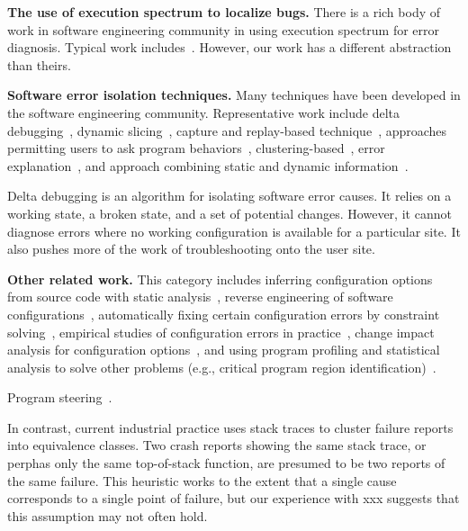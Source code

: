 \textbf{The use of execution spectrum to localize bugs.} There is a rich body of
work in software engineering community in using execution spectrum for error diagnosis.
Typical work includes~\cite{Liblit:2005:SSBI, Santelices:2009:LFU, Reps:1997:UPP,
Yilmaz:2008:TTF}. However, our work has a different abstraction than theirs.

\textbf{Software error isolation techniques.} Many techniques have been developed
in the software engineering community. Representative work include delta debugging~\cite{Zeller:2002:ICC},
dynamic slicing~\cite{Zhang:2006:LFT},
capture and replay-based technique~\cite{Qi:2011:LFE}, approaches permitting
users to ask program behaviors~\cite{Ko:2008:DRA},
clustering-based~\cite{Dickinson:2001:FFC},
error explanation~\cite{Groce:2006:EED},
and approach combining static and dynamic information~\cite{Holmes:2011:IPT, Zhang:2008:EIF}.

Delta debugging is an algorithm for isolating software error causes. It relies on
a working state, a broken state, and a set of potential changes. However, it
cannot diagnose errors where no working configuration is available for
a particular site. It also pushes more of the work of troubleshooting
onto the user site.


\textbf{Other related work.} This category includes inferring configuration options
from source code with static analysis~\cite{Rabkin:2011:SEP}, 
reverse engineering of software configurations~\cite{Wang:2008:TAR}, automatically
fixing certain configuration errors by constraint solving~\cite{rangefix},
empirical studies of configuration errors in practice~\cite{Yin:2011:ESC, Hubaux:2012},
change impact analysis for configuration options~\cite{configimpact},
and using program profiling and statistical analysis to solve
other problems (e.g., critical program region identification)~\cite{Carbin:2010:AIC}.

Program steering~\cite{Lin:2004:IAM}.


In contrast, current industrial practice uses stack traces to cluster
failure reports into equivalence classes. Two crash reports showing
the same stack trace, or perphas only the same top-of-stack function,
are presumed to be two reports of the same failure. This heuristic
works to the extent that a single cause corresponds to a single point
of failure, but our experience with xxx suggests that this
assumption may not often hold.
